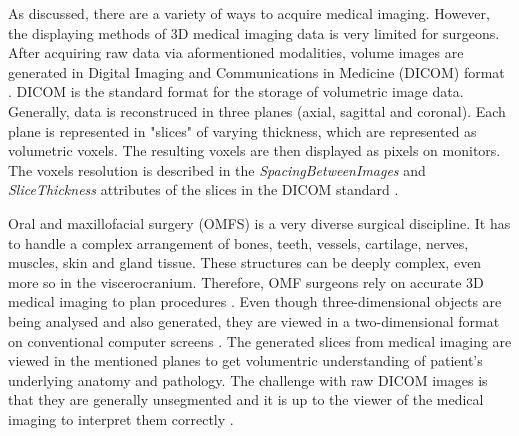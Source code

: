 As discussed, there are a variety of ways to acquire medical imaging.
However, the displaying methods of 3D medical imaging data is very limited for surgeons.
After acquiring raw data via aformentioned modalities, volume images are generated in Digital Imaging and Communications in Medicine (DICOM) format \cite{DICOMStandard}.
DICOM is the standard format for the storage of volumetric image data.
Generally, data is reconstruced in three planes (axial, sagittal and coronal).
Each plane is represented in "slices" of varying thickness, which are represented as volumetric voxels.
The resulting voxels are then displayed as pixels on monitors.
The voxels resolution is described in the \textit{SpacingBetweenImages} and \textit{SliceThickness} attributes of the slices in the DICOM standard \cite{DICOMStandard}.

Oral and maxillofacial surgery (OMFS) is a very diverse surgical discipline. It has to handle a complex arrangement of bones, teeth, vessels, cartilage, nerves, muscles, skin and gland tissue.
These structures can be deeply complex, even more so in the viscerocranium.
Therefore, OMF surgeons rely on accurate 3D medical imaging to plan procedures \cite{Fonseca.2018}.
Even though three-dimensional objects are being analysed and also generated, they are viewed in a two-dimensional format on conventional computer screens \cite{brewster1984interactive}.
The generated slices from medical imaging are viewed in the mentioned planes to get volumentric understanding of patient's underlying anatomy and pathology.
The challenge with raw DICOM images is that they are generally unsegmented and it is up to the viewer of the medical imaging to interpret them correctly \cite{Handels.2009}.


